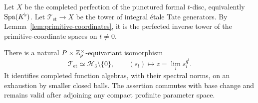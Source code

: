 Let $X$ be the completed perfection of the punctured formal $t$-disc,
equivalently $\operatorname{Spa}(K^\flat)$.  Let $\mathcal T_{\mathrm{et}}\to X$ be the tower
of integral étale Tate generators.  By
Lemma~\ref{lem:primitive-coordinates}, it is the perfected inverse
tower of the primitive-coordinate spaces on $t\ne0$.

\begin{proposition}
\label{prop:generator-ball}
There is a natural $P\times\mathbb Z_p^\times$-equivariant isomorphism
\begin{equation}
 \mathcal T_{\mathrm{et}}\simeq\mathcal H_3\setminus\{0\},
 \qquad (s_l)\longmapsto z=\lim_l s_l^{q^l}.
 \label{eq:generator-ball}
\end{equation}
It identifies completed function algebras, with their spectral norms,
on an exhaustion by smaller closed balls.  The assertion commutes
with base change and remains valid after adjoining any compact
profinite parameter space.
\end{proposition}

